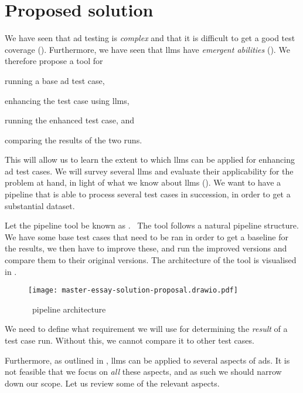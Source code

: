 \chapter{Proposed solution}\label{sec:solutionProposal}

We have seen that \acrshort{ad} testing is \textit{complex} and that it is difficult to get a good
test coverage (). Furthermore, we have seen that \acrshort{llms} have
\textit{emergent abilities} (). We therefore propose a tool for
\begin{inparaenum}
    \item running a base \acrshort{ad} test case,
    \item enhancing the test case using \acrshort{llms},
    \item running the enhanced test case,
    and
    \item comparing the results of the two runs.
\end{inparaenum}

This will allow us to learn the extent to which \acrshort{llms} can be applied for enhancing
\acrlong{ad} test cases. We will survey several \acrshort{llms} and evaluate their applicability for
the problem at hand, in light of what we know about \acrshort{llms} ().
We want to have a pipeline that is able to process several test cases in succession, in order to get
a substantial dataset.

Let the pipeline tool be known as \hefe.~%
The tool follows a natural pipeline structure. We have some base test cases that
need to be ran in order to get a baseline for the results, we then have to
improve these, and run the improved versions and compare them to their original
versions. The architecture of the tool is visualised in .

\begin{figure}[h]
    \centering
    \texttt{[image: master-essay-solution-proposal.drawio.pdf]}
    \caption{\hefe~pipeline architecture}\label{fig:hefeArch}
\end{figure}

We need to define what requirement we will use for determining the \textit{result} of a test case
run. Without this, we cannot compare it to other test cases.

Furthermore, as outlined in \citeauthor{LLM4AD}, \acrlong{llms} can be applied to several aspects
of \acrlong{ads}. It is not feasible that we focus on \textit{all} these aspects, and as such we
should narrow down our scope. Let us review some of the relevant aspects.

